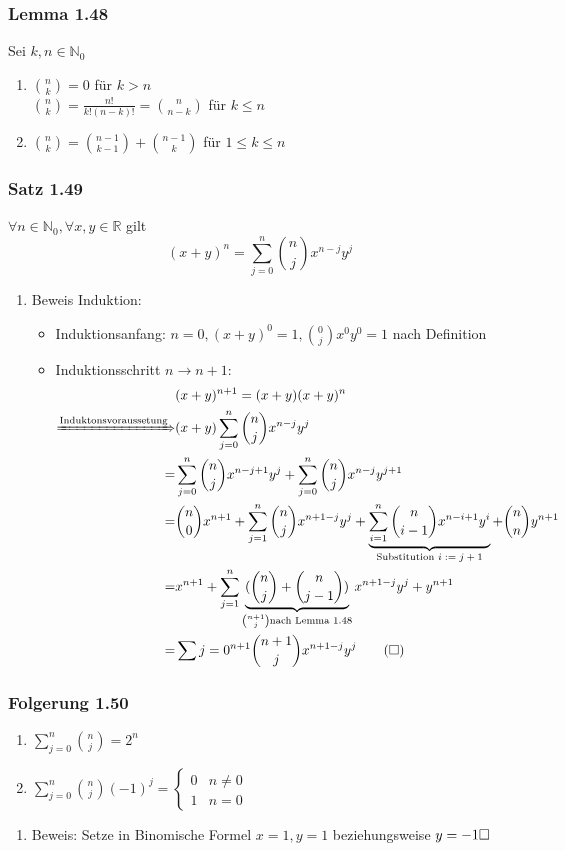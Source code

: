 \documentclass[11pt]{article}
\DeclareMathOperator{\Forall}{\forall}%
\begin{document}
\subsubsection{Lemma 1.48}
\label{sec-2-9-15}
Sei $k,n\in\mathbb{N}_0$
\begin{enumerate}
\item $\binom{n}{k} = 0$ für $k > n$ \\
       $\binom{n}{k} = \frac{n!}{k!(n -k)!} = \binom{n}{n - k}$ für $k\leq n$
\item $\binom{n}{k} = \binom{n - 1}{k - 1} + \binom{n - 1}{k}$ für $1 \leq k \leq n$
\end{enumerate}
\subsubsection{Satz 1.49}
\label{sec-2-9-16}
$\Forall n\in\mathbb{N}_0,\Forall x,y\in\mathbb{R}$ gilt
\[(x + y)^n = \sum_{j = 0}^n \binom{n}{j}x^{n - j}y^j\]
\begin{enumerate}
\item Beweis
\label{sec-2-9-16-1}
Induktion:
\begin{itemize}
\item Induktionsanfang: $n = 0,(x+y)^0 = 1,\binom{0}{j}x^0y^0 = 1$ nach Definition
\item Induktionsschritt $n \to n + 1:$
\begin{align}
&(x + y)^{n + 1} = (x +y)(x+y)^n \\
\xRightarrow{\text{Induktonsvoraussetung}} &(x + y)\sum_{j = 0}^n \binom{n}{j}x^{n - j} y^j \\
= &\sum_{j=0}^n \binom{n}{j}x^{n - j + 1}y^j + \sum_{j = 0}^n \binom{n}{j} x^{n - j} y^{j + 1} \\
= &\binom{n}{0}x^{n + 1} + \sum_{j = 1}^n \binom{n}{j}x^{n + 1 - j}y^j + \underbrace{\sum_{i = 1}^n \binom{n}{i - 1} x^{n - i + 1} y^i}_{\text{Substitution $i:= j + 1$}} + \binom{n}{n}y^{n + 1} \\
= &x^{n + 1} + \sum_{j = 1}^n \underbrace{(\binom{n}{j} + \binom{n}{j - 1})}_{\binom{n + 1}{j}\text{nach Lemma 1.48}} x^{n + 1 - j} y^j + y^{n + 1} \\
= &\sum{j = 0}^{n + 1} \binom{n + 1}{j}x^{n + 1 - j}y^j\tag{$\square$}
\end{align}
\end{itemize}
\end{enumerate}
\subsubsection{Folgerung 1.50}
\label{sec-2-9-17}
\begin{enumerate}
\item $\sum_{j = 0}^n \binom{n}{j} = 2^n$
\item $\sum_{j = 0}^n \binom{n}{j} (-1)^j = \begin{cases}0 & n \neq 0 \\ 1 & n = 0\end{cases}$
\end{enumerate}
\begin{enumerate}
\item Beweis:
\label{sec-2-9-17-1}
Setze in Binomische Formel $x = 1, y = 1$ beziehungsweise $y = -1 \hfill\square$
\end{enumerate}
\end{document}

